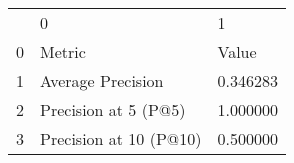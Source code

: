 \begin{tabular}{lll}
 & 0 & 1 \\
0 & Metric & Value \\
1 & Average Precision & 0.346283 \\
2 & Precision at 5 (P@5) & 1.000000 \\
3 & Precision at 10 (P@10) & 0.500000 \\
\end{tabular}

